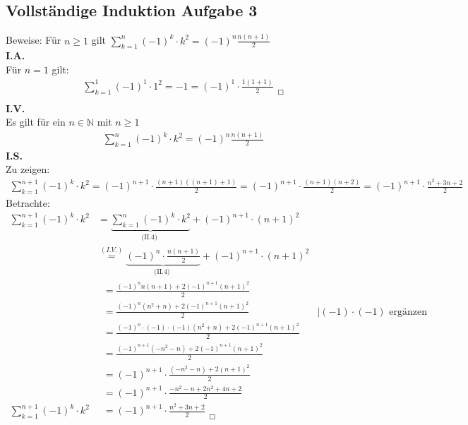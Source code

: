 \subsection{Vollständige Induktion Aufgabe 3}

Beweise: Für $ n\geq 1 $ gilt $ \sum\limits_{k=1}^{n} (-1)^k\cdot k^2=(-1)^n \frac{n(n+1)}{2}$\vspace*{2mm}\\
\textbf{I.A.}\\
Für $n=1$ gilt:
\begin{align*}
	\sum\limits_{k=1}^{1}(-1)^1\cdot 1^2=-1=(-1)^1\cdot\frac{1(1+1)}{2}_{\;\;\Square}\\
\end{align*}
\textbf{I.V.}\\
Es gilt für ein $ n\in \mathbb{N} $ mit $ n\geq 1 $\\
\begin{align}
	\sum\limits_{k=1}^{n} (-1)^k\cdot k^2=(-1)^n \frac{n(n+1)}{2}
\end{align}
\textbf{I.S.}\\
Zu zeigen:\\
\begin{align*}
	\sum\limits_{k=1}^{n+1}(-1)^k\cdot k^2=(-1)^{n+1}\cdot \frac{(n+1)((n+1)+1)}{2}=(-1)^{n+1}\cdot \frac{(n+1)(n+2)}{2}=(-1)^{n+1}\cdot\frac{n^2+3n+2}{2}
\end{align*}
\newpage
\noindent
Betrachte:\\
\begin{align*}
	\sum\limits_{k=1}^{n+1}(-1)^k\cdot k^2&=\underbrace {\sum\limits_{k=1}^{n} (-1)^k\cdot k^2}_{\text{(II.4) }}+ (-1)^{n+1}\cdot(n+1)^2\\
	&\overset{(I.V.)}{=}\underbrace {(-1)^n\cdot \frac{n(n+1)}{2}}_{\text{(II.4) }}+(-1)^{n+1} \cdot(n+1)^2\\
	&\;\;=\frac{(-1)^n n(n+1)+2(-1)^{n+1}(n+1)^2 }{2}\\
	&\;\;=\frac{(-1)^n (n^2+n)+2(-1)^{n+1}(n+1)^2 }{2}& |(-1)\cdot(-1) \text{ ergänzen }\\
	&\;\;=\frac{(-1)^n\cdot(-1)\cdot(-1) (n^2+n)+2(-1)^{n+1}(n+1)^2}{2}\\
	&\;\;=\frac{(-1)^{n+1}(-n^2-n)+2(-1)^{n+1}(n+1)^2}{2}\\
	&\;\;=(-1)^{n+1}\cdot\frac{(-n^2-n)+2(n+1)^2}{2}\\
	&\;\;=(-1)^{n+1}\cdot\frac{-n^2-n+2n^2+4n+2}{2}\\
	\sum\limits_{k=1}^{n+1}(-1)^k\cdot k^2&\;\;=(-1)^{n+1}\cdot\frac{n^2+3n+2}{2}_{\;\;\Square}\\
\end{align*}

